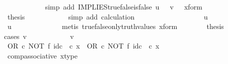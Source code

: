 \begin{isabellebody}
\ \ \ \ \ \ \ \ \ \ \isamarkupfalse%
\ {\isacharparenleft}{\kern0pt}simp\ add{\isacharcolon}{\kern0pt}\ IMPLIES{\isacharunderscore}{\kern0pt}true{\isacharunderscore}{\kern0pt}false{\isacharunderscore}{\kern0pt}is{\isacharunderscore}{\kern0pt}false\ {\isacartoucheopen}u\ {\isacharequal}{\kern0pt}\ {\isasymt}{\isacartoucheclose}\ {\isacartoucheopen}v\ {\isacharequal}{\kern0pt}\ {\isasymf}{\isacartoucheclose}\ x{\isacharunderscore}{\kern0pt}form{\isacharparenright}{\kern0pt}\isanewline
\ \ \ \ \ \ \ \ \isamarkupfalse%
\ \isamarkupfalse%
\ {\isacharquery}{\kern0pt}thesis\isanewline
\ \ \ \ \ \ \ \ \ \ \isamarkupfalse%
\ {\isacharparenleft}{\kern0pt}simp\ add{\isacharcolon}{\kern0pt}\ calculation{\isacharparenright}{\kern0pt}\isanewline
\ \ \ \ \ \ \isamarkupfalse%
\isanewline
\ \ \ \ \isamarkupfalse%
\isanewline
\ \ \ \ \ \ \isamarkupfalse%
\ {\isachardoublequoteopen}u\ {\isasymnoteq}\ {\isasymt}{\isachardoublequoteclose}\isanewline
\ \ \ \ \ \ \isamarkupfalse%
\ \isamarkupfalse%
\ {\isachardoublequoteopen}u\ {\isacharequal}{\kern0pt}\ {\isasymf}{\isachardoublequoteclose}\isanewline
\ \ \ \ \ \ \ \ \ \ \isamarkupfalse%
\ {\isacharparenleft}{\kern0pt}metis\ true{\isacharunderscore}{\kern0pt}false{\isacharunderscore}{\kern0pt}only{\isacharunderscore}{\kern0pt}truth{\isacharunderscore}{\kern0pt}values\ x{\isacharunderscore}{\kern0pt}form{\isacharparenright}{\kern0pt}\isanewline
\ \ \ \ \ \ \isamarkupfalse%
\ {\isacharquery}{\kern0pt}thesis\ \isanewline
\ \ \ \ \ \ \isamarkupfalse%
{\isacharparenleft}{\kern0pt}cases\ {\isachardoublequoteopen}v\ {\isacharequal}{\kern0pt}\ {\isasymt}{\isachardoublequoteclose}{\isacharparenright}{\kern0pt}\isanewline
\ \ \ \ \ \ \ \ \isamarkupfalse%
\ {\isachardoublequoteopen}v\ {\isacharequal}{\kern0pt}\ {\isasymt}{\isachardoublequoteclose}\isanewline
\ \ \ \ \ \ \ \ \isamarkupfalse%
\ {\isachardoublequoteopen}{\isacharparenleft}{\kern0pt}OR\ {\isasymcirc}\isactrlsub c\ NOT\ {\isasymtimes}\isactrlsub f\ id\isactrlsub c\ {\isasymOmega}{\isacharparenright}{\kern0pt}\ {\isasymcirc}\isactrlsub c\ x\ {\isacharequal}{\kern0pt}\ OR\ {\isasymcirc}\isactrlsub c\ {\isacharparenleft}{\kern0pt}NOT\ {\isasymtimes}\isactrlsub f\ id\isactrlsub c\ {\isasymOmega}{\isacharparenright}{\kern0pt}\ {\isasymcirc}\isactrlsub c\ x{\isachardoublequoteclose}\isanewline
\ \ \ \ \ \ \ \ \ \ \isamarkupfalse%
\ comp{\isacharunderscore}{\kern0pt}associative{}\ x{\isacharunderscore}{\kern0pt}type\ \isamarkupfalse%

\end{isabellebody}

